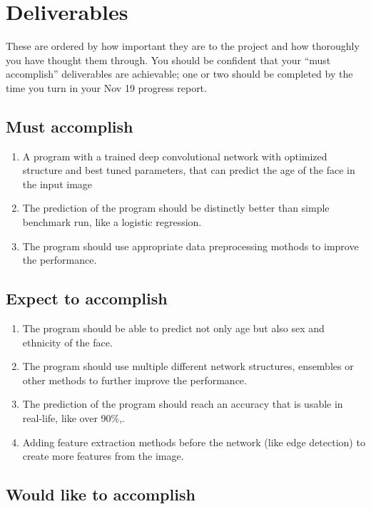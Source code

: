 \documentclass{article}
\begin{document}
\section{Deliverables}
These are ordered by how important they are to the project and how thoroughly you have thought them through. You should be confident that your ``must accomplish'' deliverables are achievable; one or two should be completed by the time you turn in your Nov 19 progress report.

\subsection{Must accomplish}

\begin{enumerate}
    \item A program with a trained deep convolutional network with optimized structure and best tuned parameters, that can predict the age of the face in the input image 
    \item The prediction of the program should be distinctly better than simple benchmark run, like a logistic regression.
    \item The program should use appropriate data preprocessing mothods to improve the performance.
\end{enumerate}

\subsection{Expect to accomplish}

\begin{enumerate}
    \item The program should be able to predict not only age but also sex and ethnicity of the face.
    \item The program should use multiple different network structures, ensembles or other methods to further improve the performance.
    \item The prediction of the program should reach an accuracy that is usable in real-life, like over 90\%,. 
    \item Adding feature extraction methods before the network (like edge detection) to create more features from the image.
\end{enumerate}

\subsection{Would like to accomplish}
\end{document}
